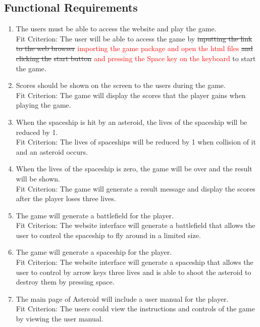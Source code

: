 \documentclass[12pt, titlepage]{article}
\begin{document}
\subsection{Functional Requirements}
\begin{enumerate}[{FR}1.]
    \item The users must be able to access the website and play the game.\\
        Fit Criterion:  The user will be able to access the game by \sout{inputting the link to the web browser} \textcolor{red}{importing the game package and open the html files} \sout{and clicking the} \sout{start button} \textcolor{red}{ and pressing the Space key on the keyboard} to start the game.
        \item Scores should be shown on the screen to the users during the game. \\
        Fit Criterion: The game will display the scores that the player gains when playing the game.
		
		\item When the spaceship is hit by an asteroid, the lives of the spaceship will be reduced by 1.\\
        Fit Criterion: The lives of spaceships will be reduced by 1 when collision of it and an asteroid occurs.
        
        \item When the lives of the spaceship is zero, the game will be over and the result will be shown.\\
        Fit Criterion: The game will generate a result message and display the scores after the player loses three lives.
       
        \item The game will generate a battlefield for the player.\\
         Fit Criterion: The website interface will generate a battlefield that allows the user to control the spaceship to fly around in a limited size.

        \item The game will generate a spaceship for the player.\\
         Fit Criterion: The website interface will generate a spaceship that allows the user to control by arrow keys three lives and is able to shoot the asteroid to destroy them by pressing space.

        \item The main page of Asteroid will include a user manual for the player.\\
	Fit Criterion: The users could view the instructions and controls of the game by viewing the user manual. 


\end{enumerate}
\end{document}
